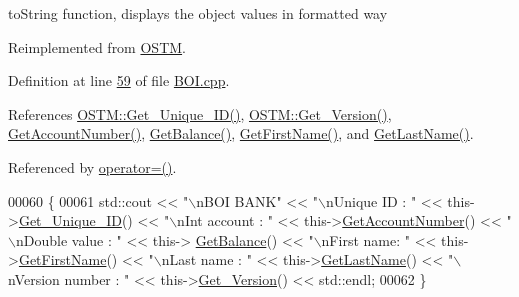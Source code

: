 to\+String function, displays the object values in formatted way 



Reimplemented from \hyperlink{class_o_s_t_m_a513396a115f2987fd07c203309ae8a59_a513396a115f2987fd07c203309ae8a59}{O\+S\+TM}.



Definition at line \hyperlink{_b_o_i_8cpp_source_l00059}{59} of file \hyperlink{_b_o_i_8cpp_source}{B\+O\+I.\+cpp}.



References \hyperlink{_o_s_t_m_8cpp_source_l00082}{O\+S\+T\+M\+::\+Get\+\_\+\+Unique\+\_\+\+I\+D()}, \hyperlink{_o_s_t_m_8cpp_source_l00100}{O\+S\+T\+M\+::\+Get\+\_\+\+Version()}, \hyperlink{_b_o_i_8cpp_source_l00096}{Get\+Account\+Number()}, \hyperlink{_b_o_i_8cpp_source_l00084}{Get\+Balance()}, \hyperlink{_b_o_i_8cpp_source_l00120}{Get\+First\+Name()}, and \hyperlink{_b_o_i_8cpp_source_l00108}{Get\+Last\+Name()}.



Referenced by \hyperlink{_b_o_i_8h_source_l00078}{operator=()}.


\begin{DoxyCode}
00060 \{
00061    std::cout << \textcolor{stringliteral}{"\(\backslash\)nBOI BANK"} << \textcolor{stringliteral}{"\(\backslash\)nUnique ID : "} << this->\hyperlink{class_o_s_t_m_a5a01a8b98d16b1d1904ecf9356e7b71d_a5a01a8b98d16b1d1904ecf9356e7b71d}{Get\_Unique\_ID}() << \textcolor{stringliteral}{"\(\backslash\)nInt account : 
      "} << this->\hyperlink{class_b_o_i_a5b18e1538f3d37835234946cdf9f240f_a5b18e1538f3d37835234946cdf9f240f}{GetAccountNumber}() << \textcolor{stringliteral}{"\(\backslash\)nDouble value : "} << this->
      \hyperlink{class_b_o_i_a25b289dece2a1685bb9d1a9332c9be0b_a25b289dece2a1685bb9d1a9332c9be0b}{GetBalance}() << \textcolor{stringliteral}{"\(\backslash\)nFirst name: "} << this->\hyperlink{class_b_o_i_ab4b9d50c6008a666aa4382def580e7d1_ab4b9d50c6008a666aa4382def580e7d1}{GetFirstName}() << \textcolor{stringliteral}{"\(\backslash\)nLast name : "} << 
      this->\hyperlink{class_b_o_i_a37828f3fa4a32f522966e2cad90eaab2_a37828f3fa4a32f522966e2cad90eaab2}{GetLastName}()  << \textcolor{stringliteral}{"\(\backslash\)nVersion number : "} << this->\hyperlink{class_o_s_t_m_a1f1db9d482f22c8e7caa17dfb340626b_a1f1db9d482f22c8e7caa17dfb340626b}{Get\_Version}() << std::endl;
00062 \}
\end{DoxyCode}


